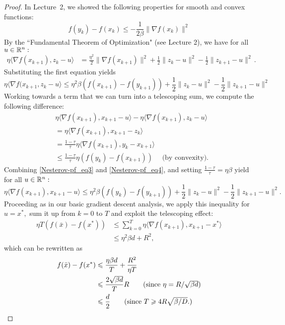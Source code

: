 \begin{proof}
In Lecture~2, we showed the following properties for smooth and convex
functions:
\begin{equation}
\label{Nesterov-pf_smoothness_and_convexity}
f(y_k) - f(x_k) \leq -\frac{1}{2 \beta} \|\nabla f(x_k) \|^2
\end{equation}
By the ``Fundamental Theorem of Optimization" (see Lecture 2), we have
for all $u\in\mathbb{R}^n:$
\begin{align}
\label{lecture7-nonsmooth}
\eta\langle \nabla f(x_{k+1}), z_k - u \rangle 
&= \frac{\eta^2}2\|\nabla f(x_{k+1})\|^2 
+ \frac12\|z_k - u \|^2 - \frac12\|z_{k+1} - u \|^2\,.
\end{align}
Substituting the first equation yields
\begin{equation}
\eta \langle \nabla f(x_{k+1}, z_k - u \rangle \leq \eta^2 \beta (f(x_{k+1}) -
f(y_{k+1})) + \frac12\|z_k - u\|^2 - \frac12\|z_{k+1} - u \|^2 \label{Nesterov-pf_eq3}
\end{equation}
\medskip
Working towards a term that we can turn into a telescoping sum, we compute the
following difference:
\begin{align}
&\eta \langle \nabla f(x_{k+1}), x_{k+1} - u\rangle - \eta \langle \nabla f(x_{k+1}), z_k - u\rangle \nonumber\\
&= \eta \langle\nabla f(x_{k+1}), x_{k+1} - z_k\rangle \nonumber\\
&= \frac{1-\tau}{\tau}  \eta \langle\nabla f(x_{k+1}), y_k - x_{k+1}\rangle \nonumber\\
&\leq \frac{1-\tau}{\tau} \eta (f(y_k) - f(x_{k+1})) \quad\text{ (by convexity)}. \label{Nesterov-pf_eq4}
\end{align}
\medskip
Combining  \eqref{Nesterov-pf_eq3} and \eqref{Nesterov-pf_eq4}, and setting
$\frac{1-\tau}{\tau} = \eta \beta$ yield for all $u\in\mathbb{R}^n:$
\begin{equation*}
\eta\langle\nabla f(x_{k+1}), x_{k+1} - u\rangle \leq \eta^2 \beta
(f(y_k) - f(y_{k+1})) + \frac12\|z_k - u\|^2 - \frac12\|z_{k+1} - u\|^2.
\end{equation*}
Proceeding as in our basic gradient descent analysis, we apply this inequality
for $u=x^*,$ sum it up from $k=0$ to $T$ and exploit the telescoping effect:
\begin{align*}
\eta T (f(\bar{x}) - f(x^*)) 
&\leq \sum_{k=0}^T \eta \langle\nabla f(x_{k+1}), x_{k+1} - x^*\rangle\\
&\leq \eta^2 \beta d + R^2,
\end{align*}
which can be rewritten as
\begin{align*}
f(\bar{x}) - f(x^*) 
&\leq \frac{\eta\beta d}{T} + \frac{R^2}{\eta T} \\
&\leq \frac{2\sqrt{\beta d}}{T} R \tag{since $\eta=R/\sqrt{\beta d}$} \\
&\leq \frac{d}{2} \tag{since $T\ge 4R\sqrt{\beta/D}.$}
\end{align*}
\end{proof}

